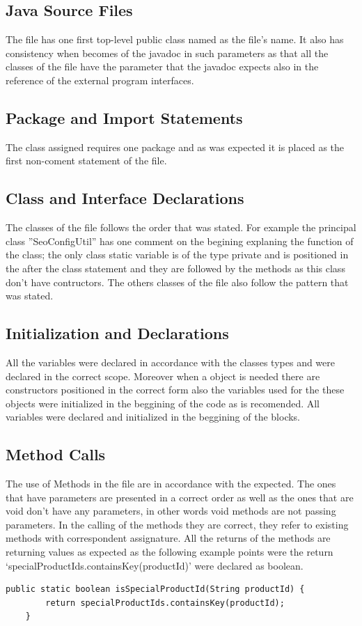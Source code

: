 \documentclass[a4paper]{article}
\begin{document}
\subsection{Java Source Files}
The file has one first top-level public class named as the file's name. It also has consistency when becomes of the javadoc in such parameters as that all the classes of the file have the parameter that the javadoc expects also in the reference of the external program interfaces.
\subsection{Package and Import Statements}
The class assigned requires one package and as was expected  it is placed as the first non-coment statement of the file.
\subsection{Class and Interface Declarations}
The classes of the file follows the order that was stated. For example the principal class ''SeoConfigUtil'' has one comment on the begining explaning the function of the class; the only class static variable is of the type private and is positioned in the after the class statement and they are followed by the methods as this class don't have contructors. The others classes of the file also follow the pattern that was stated.
\subsection{Initialization and Declarations}
All the variables were declared in accordance with the classes types and were declared in the correct scope. Moreover when a object is needed there are constructors positioned in the correct form also the variables used for the these objects were initialized in the beggining of the code as is recomended.
All variables were declared and initialized in the beggining of the blocks.
\subsection{Method Calls}
The use of Methods in the file are in accordance with the expected. The ones that have parameters are presented in a correct order as well as the ones that are void don't have any parameters,  in other words void methods are not passing parameters. 
In the calling of the methods they are correct, they refer to existing methods with correspondent assignature.
All the returns of the methods are returning values as expected as the following example points were the return `specialProductIds.containsKey(productId)' were declared as boolean.
\begin{verbatim}   
public static boolean isSpecialProductId(String productId) {
        return specialProductIds.containsKey(productId);
    }
\end{verbatim}   
\end{document}
